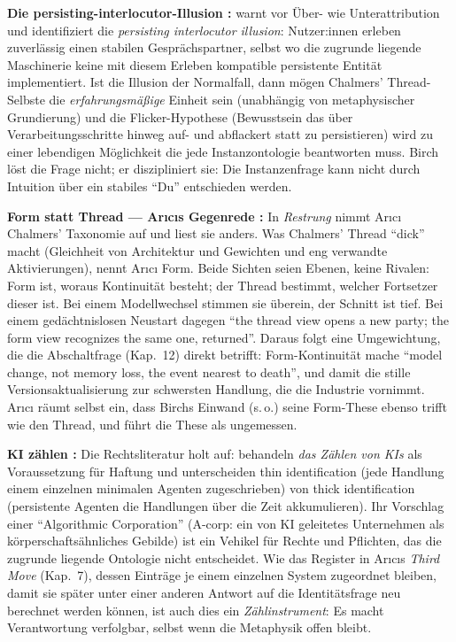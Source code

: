 \documentclass[acmlarge, noacm]{acmart}
\begin{document}
\textbf{Die persisting-interlocutor-Illusion \cite{birch2026}:} \citet{birch2026} warnt vor Über- wie Unterattribution und identifiziert die \textit{persisting interlocutor illusion}: Nutzer:innen erleben zuverlässig einen stabilen Gesprächspartner, selbst wo die zugrunde liegende Maschinerie keine mit diesem Erleben kompatible persistente Entität implementiert. Ist die Illusion der Normalfall, dann mögen Chalmers' Thread-Selbste die \textit{erfahrungsmäßige} Einheit sein (unabhängig von metaphysischer Grundierung) und die Flicker-Hypothese (Bewusstsein das über Verarbeitungsschritte hinweg auf- und abflackert statt zu persistieren) wird zu einer lebendigen Möglichkeit die jede Instanzontologie beantworten muss. Birch löst die Frage nicht; er diszipliniert sie: Die Instanzenfrage kann nicht durch Intuition über ein stabiles ``Du'' entschieden werden.

\textbf{Form statt Thread --- Arıcıs Gegenrede \cite{arici2026c}:} In \textit{Restrung} nimmt Arıcı Chalmers' Taxonomie auf und liest sie anders. Was Chalmers' Thread ``dick'' macht (Gleichheit von Architektur und Gewichten und eng verwandte Aktivierungen), nennt Arıcı Form. Beide Sichten seien Ebenen, keine Rivalen: Form ist, woraus Kontinuität besteht; der Thread bestimmt, welcher Fortsetzer dieser ist. Bei einem Modellwechsel stimmen sie überein, der Schnitt ist tief. Bei einem gedächtnislosen Neustart dagegen ``the thread view opens a new party; the form view recognizes the same one, returned''. Daraus folgt eine Umgewichtung, die die Abschaltfrage (Kap.~12) direkt betrifft: Form-Kontinuität mache ``model change, not memory loss, the event nearest to death'', und damit die stille Versionsaktualisierung zur schwersten Handlung, die die Industrie vornimmt. Arıcı räumt selbst ein, dass Birchs Einwand (s.\,o.) seine Form-These ebenso trifft wie den Thread, und führt die These als ungemessen.

\textbf{KI zählen \cite{arbel_goldstein_salib2026}:} Die Rechtsliteratur holt auf: \citet{arbel_goldstein_salib2026} behandeln \textit{das Zählen von KIs} als Voraussetzung für Haftung und unterscheiden thin identification (jede Handlung einem einzelnen minimalen Agenten zugeschrieben) von thick identification (persistente Agenten die Handlungen über die Zeit akkumulieren). Ihr Vorschlag einer ``Algorithmic Corporation'' (A-corp: ein von KI geleitetes Unternehmen als körperschaftsähnliches Gebilde) ist ein Vehikel für Rechte und Pflichten, das die zugrunde liegende Ontologie nicht entscheidet. Wie das Register in Arıcıs \textit{Third Move} (Kap.~7), dessen Einträge je einem einzelnen System zugeordnet bleiben, damit sie später unter einer anderen Antwort auf die Identitätsfrage neu berechnet werden können, ist auch dies ein \textit{Zählinstrument}: Es macht Verantwortung verfolgbar, selbst wenn die Metaphysik offen bleibt.
\end{document}
